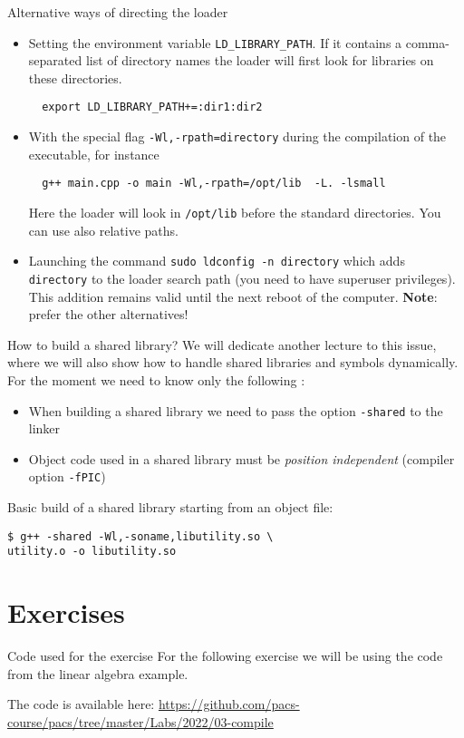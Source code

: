 \documentclass[10pt]{beamer}
\begin{document}
\begin{frame}[fragile]{Alternative ways of directing the loader}
  \begin{itemize}
  \item Setting the environment variable \texttt{LD\_LIBRARY\_PATH}. If
    it contains a comma-separated list of directory names the
    loader will first look for libraries on these directories.
\begin{verbatim}
  export LD_LIBRARY_PATH+=:dir1:dir2
\end{verbatim}
\item With the special flag \texttt{-Wl,-rpath=directory}
  during the compilation of the executable, for instance
\begin{verbatim}
  g++ main.cpp -o main -Wl,-rpath=/opt/lib  -L. -lsmall
\end{verbatim}
Here the loader will look in \texttt{/opt/lib} before the standard directories. You can use also relative paths.
\item Launching the command \texttt{sudo ldconfig -n directory} which adds \texttt{directory} to the loader search path (you need to have superuser privileges). This addition remains valid until the next reboot of the computer. \textbf{Note}: prefer the other alternatives!
  \end{itemize}
\end{frame}

\begin{frame}[fragile]{How to build a shared library?}
  We will dedicate another lecture to this issue, where we will also show how to handle shared libraries and symbols dynamically.
  For the moment we need to know only the following :
  \begin{itemize}
  \item When building a shared library we need to pass the option \texttt{-shared} to the linker
  \item Object code used in a shared library must be \emph{position independent} (compiler option \texttt{-fPIC})
  \end{itemize}

  Basic build of a shared library starting from an object file:
\begin{verbatim}
$ g++ -shared -Wl,-soname,libutility.so \
utility.o -o libutility.so
\end{verbatim}
\end{frame}


\section{Exercises}
\begin{frame}{Code used for the exercise}
  For the following exercise we will be using the code from the linear algebra example.

  The code is available here: \url{https://github.com/pacs-course/pacs/tree/master/Labs/2022/03-compile}
\end{frame}
\end{document}
